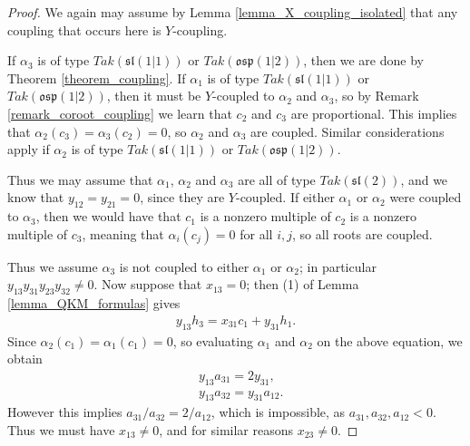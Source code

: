 \documentclass[12pt, a4paper, reqno]{amsart}
\def\p{\mathfrak{p}}
\def\l{\mathfrak{l}}
\def\s{\mathfrak{s}}
\def\o{\mathfrak{o}}
\theoremstyle{definition}
\theoremstyle{definition}
\theoremstyle{definition}
\numberwithin{theorem}{section}
\numberwithin{lemma}{section}
\numberwithin{remark}{section}
\numberwithin{definition}{section}
\numberwithin{corollary}{section}
\numberwithin{proposition}{section}
\numberwithin{example}{section}
\begin{document}
	\begin{proof}
		We again may assume by Lemma \ref{lemma_X_coupling_isolated} that any coupling that occurs here is $Y$-coupling.
		
		If $\alpha_3$ is of type $Tak(\s\l(1|1))$ or $Tak(\o\s\p(1|2))$, then we are done by Theorem \ref{theorem_coupling}.  If $\alpha_1$ is of type $Tak(\s\l(1|1))$ or $Tak(\o\s\p(1|2))$, then it must be $Y$-coupled to $\alpha_2$ and $\alpha_3$, so by Remark \ref{remark_coroot_coupling} we learn that $c_2$ and $c_3$ are proportional.  This implies that $\alpha_2(c_3)=\alpha_3(c_2)=0$, so $\alpha_2$ and $\alpha_3$ are coupled.  Similar considerations apply if $\alpha_2$ is of type $Tak(\s\l(1|1))$ or $Tak(\o\s\p(1|2))$.
		
		Thus we may assume that \(\alpha_1\), \(\alpha_2\) and \(\alpha_3\) are all of type $Tak(\s\l(2))$, and we know that $y_{12}=y_{21}=0$, since they are $Y$-coupled.  If either $\alpha_1$ or $\alpha_2$ were coupled to $\alpha_3$, then we would have that $c_1$ is a nonzero multiple of $c_2$ is a nonzero multiple of $c_3$, meaning that $\alpha_i(c_j)=0$ for all $i,j$, so all roots are coupled.  
		
		Thus we assume $\alpha_3$ is not coupled to either $\alpha_1$ or $\alpha_2$; in particular $y_{13}y_{31}y_{23}y_{32}\neq0$.  Now suppose that \(x_{13} = 0\); then (1) of Lemma \ref{lemma_QKM_formulas} gives 
		\begin{align*}
			y_{13}h_3 = x_{31}c_1 + y_{31}h_1.
		\end{align*}
		Since \(\alpha_2(c_1)=\alpha_1(c_1) = 0\), so evaluating \(\alpha_1\) and \(\alpha_2\) on the above equation, we obtain
		\begin{align*}
			&y_{13}a_{31} = 2y_{31}, \\
			&y_{13}a_{32} = y_{31}a_{12}.
		\end{align*}
		However this implies $a_{31}/a_{32}=2/a_{12}$, which is impossible, as \(a_{31},a_{32},a_{12} < 0\). Thus we must have $x_{13}\neq0$, and for similar reasons $x_{23}\neq0$.
		

\end{proof}
\end{document}
